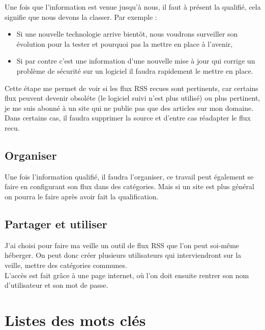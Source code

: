 \documentclass[11pt,a4paper,oneside]{book}
\begin{document}
Une fois que l'information est venue jusqu'à nous, il faut à présent la qualifié, cela signifie que nous devons la classer.
Par exemple :
\begin{itemize}
\item Si une nouvelle technologie arrive bientôt, nous voudrons surveiller son évolution pour la tester et pourquoi pas la mettre en place à l'avenir,
\item Si par contre c'est une information d'une nouvelle mise à jour qui corrige un problème de  sécurité sur un logiciel il faudra rapidement le mettre en place.
\end{itemize}
Cette étape me permet de voir si les flux RSS recues sont pertinents, car certains flux peuvent devenir obsoléte (le logiciel suivi n'est plus utilisé) ou plus pertinent, je me suis abonné à un site qui ne publie pas que des articles sur mon domaine. \\
Dans certains cas, il faudra supprimer la source et d'entre cas réadapter le flux recu.

\subsection{Organiser}

Une fois l'information qualifié, il faudra l'organiser, ce travail peut également se faire en configurant son flux dans des catégories. Mais si un site est plus général on pourra le faire après avoir fait la qualification.

\subsection{Partager et utiliser}

J'ai choisi pour faire ma veille un outil de flux RSS que l'on peut soi-même héberger.
On peut donc créer plusieurs utilisateurs qui interviendront sur la veille, mettre des catégories communes. \\
L'accès est fait grâce à une page internet, où l'on doit ensuite rentrer son nom d'utilisateur et son mot de passe.

\section{Listes des mots clés}

\newpage
\end{document}

